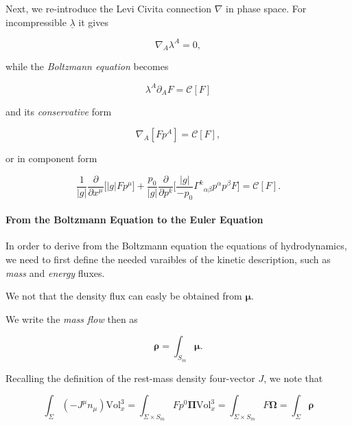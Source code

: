 Next, we re-introduce the Levi Civita connection $\nabla$ in phase space. 
For incompressible $\underline{\lambda}$ it gives

\begin{equation}
    \nabla_A\lambda^A=0,
\end{equation}

while the \textit{Boltzmann equation} becomes 

\begin{equation}
    \lambda^A\partial_A F=\mathcal{C}[F]
\end{equation}

and its \textit{conservative} form 

\begin{equation}
    \nabla_A[Fp^{A}] = \mathcal{C}[F],
    \label{eq:theory:liouvilletheorem}
\end{equation}

or in component form

\begin{equation}
    \frac{1}{|g|}\frac{\partial}{\partial x^{\mu}}\Bigg[|g|Fp^{\mu}\Bigg] + \frac{p_0}{|g|}\frac{\partial}{\partial p^{k}}\Bigg[\frac{|g|}{-p_0}{\Gamma^k}_{\alpha\beta}p^{\alpha}p^{\beta}F\Bigg] = \mathcal{C}[F].
\end{equation}



\paragraph{From the Boltzmann Equation to the Euler Equation}



In order to derive from the Boltzmann equation the equations of hydrodynamics, we need to first define the needed varaibles of the kinetic description, such as \textit{mass} and \textit{energy} fluxes. 

We not that the density flux can easly be obtained from $\boldsymbol{\mu}$. 

We write the \textit{mass flow} then as 

\begin{equation}
\boldsymbol{\rho} = \int_{S_m} \boldsymbol{\mu}.
\end{equation}

Recalling the definition of the rest-mass density four-vector $J$, we note that

\begin{equation}
\int_{\Sigma}(-J^{\mu}n_{\mu})\text{Vol}_x ^3 = \int_{\Sigma\times S_{m}} Fp^0\boldsymbol{\Pi}\text{Vol}_x ^3 = \int_{\Sigma\times S_{m}} F\boldsymbol{\Omega} = \int_{\Sigma}\boldsymbol{\rho}
\end{equation}

